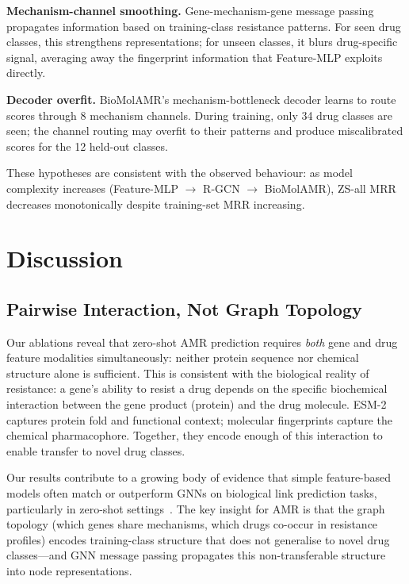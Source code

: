 \documentclass[conference]{IEEEtran}
\begin{document}
\textbf{Mechanism-channel smoothing.} Gene-mechanism-gene message passing
propagates information based on training-class resistance patterns. For seen
drug classes, this strengthens representations; for unseen classes, it blurs
drug-specific signal, averaging away the fingerprint information that Feature-MLP
exploits directly.

\textbf{Decoder overfit.} BioMolAMR's mechanism-bottleneck decoder learns
to route scores through 8 mechanism channels. During training, only 34 drug
classes are seen; the channel routing may overfit to their patterns and
produce miscalibrated scores for the 12 held-out classes.

These hypotheses are consistent with the observed behaviour: as model
complexity increases (Feature-MLP $\to$ R-GCN $\to$ BioMolAMR), ZS-all MRR
decreases monotonically despite training-set MRR increasing.

\section{Discussion}
\label{sec:discussion}

\subsection{Pairwise Interaction, Not Graph Topology}
Our ablations reveal that zero-shot AMR prediction requires \emph{both} gene
and drug feature modalities simultaneously: neither protein sequence nor
chemical structure alone is sufficient. This is consistent with the biological
reality of resistance: a gene's ability to resist a drug depends on the
specific biochemical interaction between the gene product (protein) and the
drug molecule. ESM-2 captures protein fold and functional context;
molecular fingerprints capture the chemical pharmacophore. Together, they
encode enough of this interaction to enable transfer to novel drug classes.

Our results contribute to a growing body of evidence that simple feature-based
models often match or outperform GNNs on biological link prediction tasks,
particularly in zero-shot settings~\cite{huang2020skipgnn,mao2023revisiting}.
The key insight for AMR is that the graph topology (which genes share
mechanisms, which drugs co-occur in resistance profiles) encodes training-class
structure that does not generalise to novel drug classes---and GNN message
passing propagates this non-transferable structure into node representations.
\end{document}
